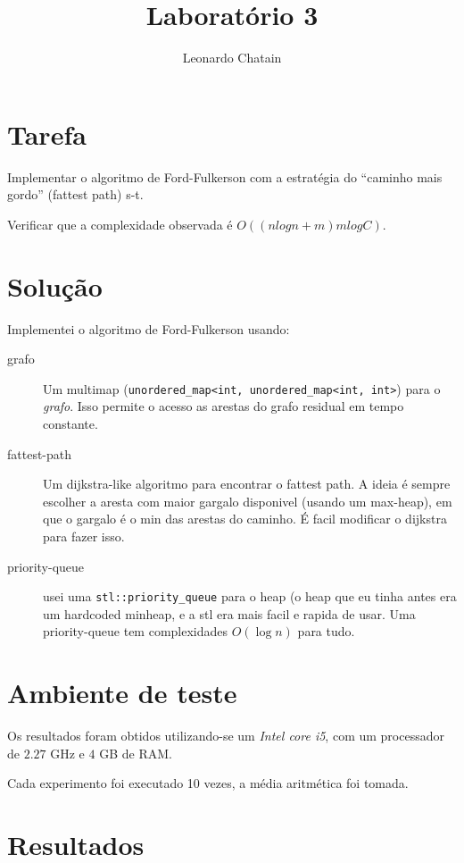 \documentclass{article}
\title{Laboratório 3}
\author{Leonardo Chatain}
\begin{document}
\maketitle

\section{Tarefa}

Implementar o algoritmo de Ford-Fulkerson com a estratégia do ``caminho mais gordo'' (fattest path)
s-t.

Verificar que a complexidade observada é $ O((nlogn + m)m log C) $.

\section{Solução}

Implementei o algoritmo de Ford-Fulkerson usando:

\begin{description}
 \item[grafo] Um multimap (\texttt{unordered\_map<int, unordered\_map<int, int>}) para o
\emph{grafo}. Isso permite o
acesso as arestas do grafo residual em tempo constante.

 \item[fattest-path] Um dijkstra-like algoritmo para encontrar o fattest path. A ideia é
sempre escolher a aresta com maior gargalo disponivel (usando um max-heap), em que o gargalo é o
min das arestas do caminho. É facil modificar o dijkstra para fazer isso.

 \item[priority-queue] usei uma \texttt{stl::priority\_queue} para o heap (o heap que eu tinha antes
era um hardcoded minheap, e a stl era mais facil e rapida de usar. Uma priority-queue tem
complexidades $O(\log n)$ para tudo.
\end{description}

\section{Ambiente de teste}

Os resultados foram obtidos utilizando-se um \emph{Intel core i5}, com um processador de $2.27$ GHz
e $4$ GB de RAM.

Cada experimento foi executado 10 vezes, a média aritmética foi tomada.

\section{Resultados}
\end{document}
